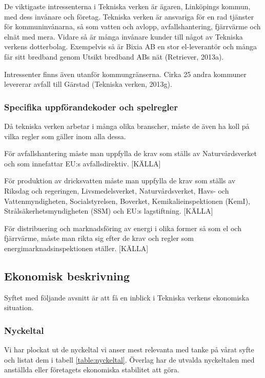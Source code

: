 \documentclass[10pt,a4paper]{article}
\begin{document}
De viktigaste intressenterna i Tekniska verken är ägaren, Linköpings kommun,
med dess invånare och företag. Tekniska verken är ansvariga för en rad tjänster
för kommuninvånarna, så som vatten och avlopp, avfallshantering, fjärrvärme och
elnät med mera. Vidare så är många invånare kunder till något av Tekniska
verkens dotterbolag. Exempelvis så är Bixia AB en stor el-leverantör och många
får sitt bredband genom Utsikt bredband ABs nät (Retriever, 2013a). 

Intressenter finns även utanför kommungränserna. Cirka 25 andra kommuner
levererar avfall till Gärstad (Tekniska verken, 2013g).

\subsubsection{Specifika uppförandekoder och spelregler} 
Då tekniska verken arbetar i många olika branscher, måste de även ha koll på
vilka regler som gäller inom alla dessa.

För avfallshantering måste man uppfylla de krav som ställs av Naturvårdsverket och
som innefattar EU:s avfallsdirektiv. [KÄLLA]

För produktion av dricksvatten måste man uppfylla de krav som ställs av Riksdag
och regeringen, Livsmedelsverket, Naturvårdsverket, Havs- och Vattenmyndigheten,
Socialstyrelsen, Boverket, Kemikalieinspektionen (KemI), Strålsäkerhetsmyndigheten 
(SSM) och EU:s lagstiftning. [KÄLLA]

För distribuering och marknadsföring av energi i olika former så som el och
fjärrvärme, måste man rikta sig efter de krav och regler som
energimarknadsinspektionen ställer. [KÄLLA]


\subsection{Ekonomisk beskrivning}
Syftet med följande avsnitt är att få en inblick i Tekniska verkens ekonomiska
situation.

\subsubsection{Nyckeltal}
Vi har plockat ut de nyckeltal vi anser mest relevanta med tanke på vårat syfte och listat dem i tabell \ref{table:nyckeltal}. Överlag har de utvalda nyckeltalen med anställda eller företagets ekonomiska stabilitet att göra.
\end{document}

